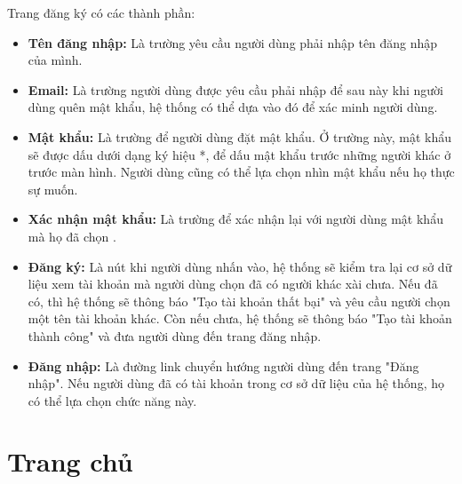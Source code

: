Trang đăng ký có các thành phần:
\begin{itemize}
    \item \textbf{Tên đăng nhập:} Là trường yêu cầu người dùng phải nhập tên đăng nhập của mình. 
    \item \textbf{Email:} Là trường người dùng được yêu cầu phải nhập để sau này khi người dùng quên mật khẩu, hệ thống có thể dựa vào đó để xác minh người dùng.
    \item \textbf{Mật khẩu:} Là trường để người dùng đặt mật khẩu. Ở trường này, mật khẩu sẽ được dấu dưới dạng ký hiệu *, để dấu mật khẩu trước những người khác ở trước màn hình. Người dùng cũng có thể lựa chọn nhìn mật khẩu nếu họ thực sự muốn.
    \item \textbf{Xác nhận mật khẩu:} Là trường để xác nhận lại với người dùng mật khẩu mà họ đã chọn .
    \item \textbf{Đăng ký:} Là nút khi người dùng nhấn vào, hệ thống sẽ kiểm tra lại cơ sở dữ liệu xem tài khoản mà người dùng chọn đã có người khác xài chưa. Nếu đã có, thì hệ thống sẽ thông báo "Tạo tài khoản thất bại" và yêu cầu người chọn một tên tài khoản khác. Còn nếu chưa, hệ thống sẽ thông báo "Tạo tài khoản thành công" và đưa người dùng đến trang đăng nhập.
    \item \textbf{Đăng nhập:} Là đường link chuyển hướng người dùng đến trang "Đăng nhập". Nếu người dùng đã có tài khoản trong cơ sở dữ liệu của hệ thống, họ có thể lựa chọn chức năng này.
\end{itemize}


\section{Trang chủ}

